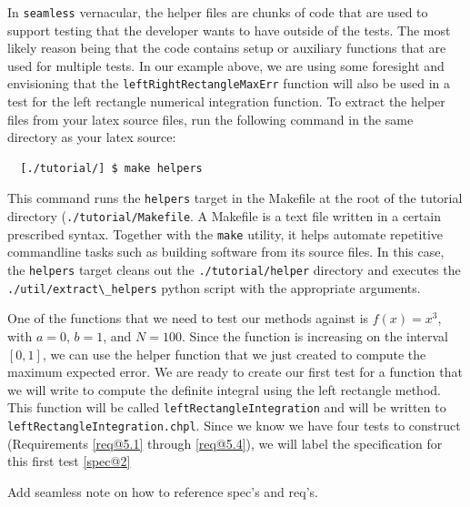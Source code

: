 \begin{seamlessnote}
  In \lstinline{seamless} vernacular, the helper files are chunks of code that are used to support
  testing that the developer wants to have outside of the tests. The most likely reason being that
  the code contains setup or auxiliary functions that are used for multiple tests. In our example
  above, we are using some foresight and envisioning that the \lstinline{leftRightRectangleMaxErr}
  function will also be used in a test for the left rectangle numerical integration function. To 
  extract the helper files from your latex source files, run the following command in the same
  directory as your latex source:
  \begin{verbatim}
  [./tutorial/] $ make helpers
  \end{verbatim}
  This command runs the \lstinline{helpers} target in the Makefile at the root of the 
  tutorial directory (\lstinline{./tutorial/Makefile}. A Makefile is a text 
    file written in a certain prescribed syntax. Together with the \lstinline{make} utility, it 
    helps automate repetitive commandline tasks such as building software from its source files. 
    In this case, the \lstinline{helpers} target cleans out the \lstinline{./tutorial/helper} directory and
    executes the \lstinline{./util/extract\_helpers} python script with the appropriate arguments.
  \end{seamlessnote}

  One of the functions that we need to test our methods against is $f(x) = x^3$, 
  with $a=0$, $b=1$, and $N=100$.
  Since the function is increasing on the interval $[0,1]$, we can use 
  the helper function that we just created to compute the maximum expected error. We are
  ready to create our first test for a function that we will write to compute the definite
  integral using the left rectangle method. This function will be called 
  \lstinline{leftRectangleIntegration}
  and will be written to \lstinline{leftRectangleIntegration.chpl}.
  Since we know we have four tests to construct (Requirements \ref{req@5.1} through \ref{req@5.4}),
  we will label the specification for this first test \ref{spec@2}
  \begin{TODO}
    Add seamless note on how to reference spec's and req's.
  \end{TODO}

